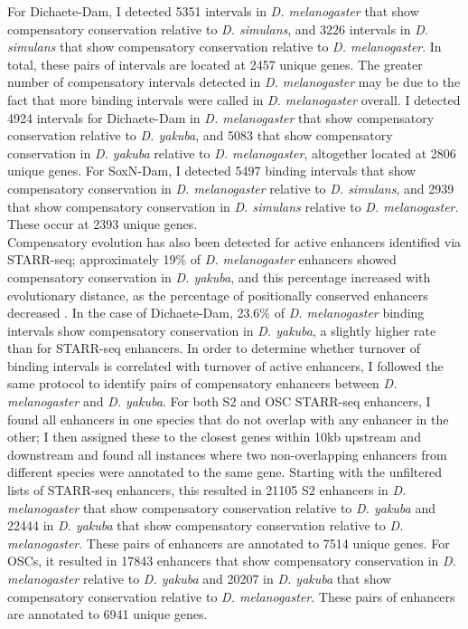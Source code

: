 For Dichaete-Dam, I detected 5351 intervals in \emph{D. melanogaster} that show compensatory conservation relative to \emph{D. simulans}, and 3226 intervals in \emph{D. simulans} that show compensatory conservation relative to \emph{D. melanogaster}. In total, these pairs of intervals are located at 2457 unique genes. The greater number of compensatory intervals detected in \emph{D. melanogaster} may be due to the fact that more binding intervals were called in \emph{D. melanogaster} overall. I detected 4924 intervals for Dichaete-Dam in \emph{D. melanogaster} that show compensatory conservation relative to \emph{D. yakuba}, and 5083 that show compensatory conservation in \emph{D. yakuba} relative to \emph{D. melanogaster}, altogether located at 2806 unique genes. For SoxN-Dam, I detected 5497 binding intervals that show compensatory conservation in \emph{D. melanogaster} relative to \emph{D. simulans}, and 2939 that show compensatory conservation in \emph{D. simulans} relative to \emph{D. melanogaster}. These occur at 2393 unique genes.\\

Compensatory evolution has also been detected for active enhancers identified via STARR-seq; approximately 19\% of \emph{D. melanogaster} enhancers showed compensatory conservation in \emph{D. yakuba}, and this percentage increased with evolutionary distance, as the percentage of positionally conserved enhancers decreased \citep{arnold_quantitative_2014}. In the case of Dichaete-Dam, 23.6\% of \emph{D. melanogaster} binding intervals show compensatory conservation in \emph{D. yakuba}, a slightly higher rate than for STARR-seq enhancers. In order to determine whether turnover of binding intervals is correlated with turnover of active enhancers, I followed the same protocol to identify pairs of compensatory enhancers between \emph{D. melanogaster} and \emph{D. yakuba}. For both S2 and OSC STARR-seq enhancers, I found all enhancers in one species that do not overlap with any enhancer in the other; I then assigned these to the closest genes within 10kb upstream and downstream and found all instances where two non-overlapping enhancers from different species were annotated to the same gene. Starting with the unfiltered lists of STARR-seq enhancers, this resulted in 21105 S2 enhancers in \emph{D. melanogaster} that show compensatory conservation relative to \emph{D. yakuba} and 22444 in \emph{D. yakuba} that show compensatory conservation relative to \emph{D. melanogaster}. These pairs of enhancers are annotated to 7514 unique genes. For OSCs, it resulted in 17843 enhancers that show compensatory conservation in \emph{D. melanogaster} relative to \emph{D. yakuba} and 20207 in \emph{D. yakuba} that show compensatory conservation relative to \emph{D. melanogaster}. These pairs of enhancers are annotated to 6941 unique genes.\\

